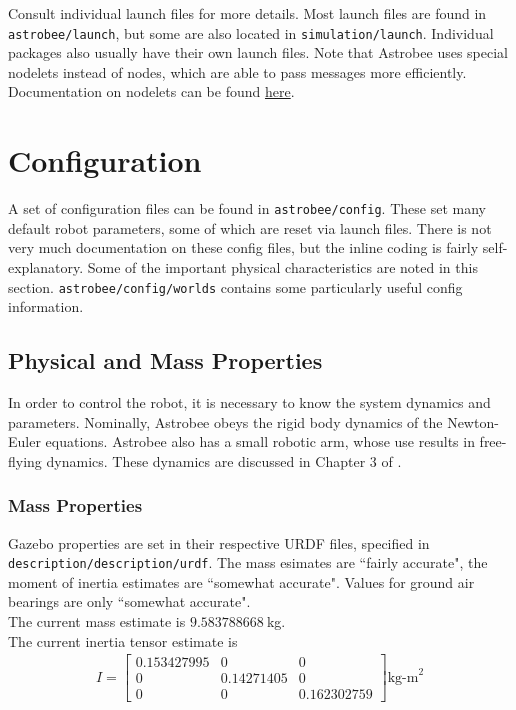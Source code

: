 \documentclass{article}
\begin{document}
Consult individual launch files for more details. Most launch files are found in \texttt{astrobee/launch}, but some are also located in \texttt{simulation/launch}. Individual packages also usually have their own launch files. Note that Astrobee uses special nodelets instead of nodes, which are able to pass messages more efficiently. Documentation on nodelets can be found \href{http://wiki.ros.org/nodelet}{here}.

\section{Configuration}

A set of configuration files can be found in \texttt{astrobee/config}. These set many default robot parameters, some of which are reset via launch files. There is not very much documentation on these config files, but the inline coding is fairly self-explanatory. Some of the important physical characteristics are noted in this section. \texttt{astrobee/config/worlds} contains some particularly useful config information.

\subsection{Physical and Mass Properties}

In order to control the robot, it is necessary to know the system dynamics and parameters. Nominally, Astrobee obeys the rigid body dynamics of the Newton-Euler equations. Astrobee also has a small robotic arm, whose use results in free-flying dynamics. These dynamics are discussed in Chapter 3 of \cite{Albee2019}.

\subsubsection{Mass Properties}

Gazebo properties are set in their respective URDF files, specified in \\
\texttt{description/description/urdf}. The mass esimates are ``fairly accurate", the moment of inertia estimates are ``somewhat accurate". Values for ground air bearings are only ``somewhat accurate".
\\

The current mass estimate is $9.583788668\ $kg.
\\

The current inertia tensor estimate is
\begin{align*}
    I =  
    \begin{bmatrix}
              0.153427995 & 0 & 0\\
              0 & 0.14271405 & 0\\
              0 & 0 & 0.162302759
    \end{bmatrix}  \text{kg-m}^2\\
\end{align*}
\end{document}
